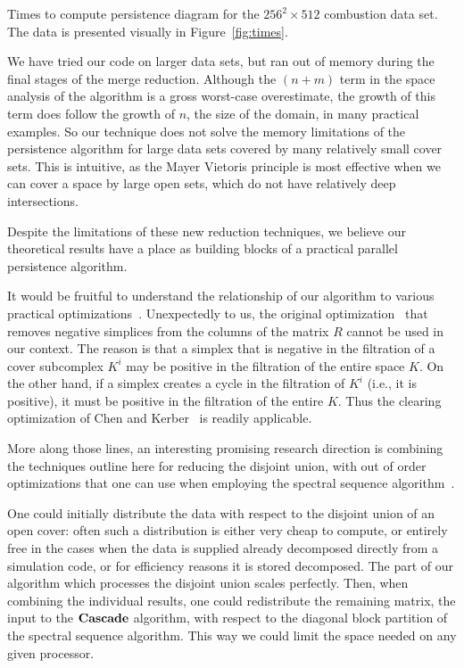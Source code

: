 \begin{table}
    \centering
    \pgfplotstabletypeset
    [
        every head row/.style={
            before row={
                \toprule
            },
            after row=\midrule,
        },
        columns={proc, time},
        columns/proc/.style         ={column name=processors, int detect, column type={r}},
        columns/time/.style         ={column name=seconds, fixed, column type={|r}},
    ]
    {\pltCombustionMed}
    \caption{Times to compute persistence diagram for the $256^2 \times 512$
             combustion data set. The data is presented visually in
             Figure~\ref{fig:times}.}
    \label{tbl:times}
\end{table}

We have tried our code on larger data sets, but ran out of memory during the
final stages of the merge reduction. Although the $(n+m)$ term in the space analysis of the
 algorithm is a gross worst-case overestimate, the growth of this
term does follow the growth of $n$, the size of the domain, in many practical
examples. So our technique does not solve the memory limitations of the
persistence algorithm for large data sets covered by many relatively small cover sets. This is
intuitive, as the Mayer Vietoris principle is most effective when we can cover a space by large open sets, which do not
have relatively deep intersections. 

Despite the limitations of these new reduction techniques, we believe our theoretical
results have a place as building blocks of a practical parallel persistence algorithm.

It would be fruitful to understand the relationship of our algorithm
to various practical optimizations~\cite{bkr-cccph-13}. 
Unexpectedly to us, the original optimization~\cite{elz-tps-02} that removes negative
simplices from the columns of the matrix $R$ cannot be used in our context.
The reason is that a simplex that is
negative in the filtration of a cover subcomplex $K^i$ may be positive in the
filtration of the entire space $K$.
On the other hand, if a simplex creates a cycle in the filtration of $K^i$
(i.e., it is positive), it must be positive in the filtration of the entire $K$.
Thus the clearing optimization of Chen and Kerber~\cite{bkr-cccph-13}
is readily applicable.

More along those lines, an interesting promising research direction is
combining the techniques outline here for reducing the disjoint union, with out of order optimizations that one can use when
employing the spectral sequence algorithm~\cite{bkr-cccph-13}.

One could initially distribute the data with respect to the disjoint union of an open cover:
often such a distribution is either very cheap to compute, or entirely
free in the cases when the data is supplied already decomposed directly from a simulation code,
or for efficiency reasons it is stored decomposed. The part of our algorithm which processes
the disjoint union scales perfectly. Then, when combining the individual results, one
could redistribute the remaining matrix, the input to the ${\bf Cascade}$
algorithm, with respect to the diagonal block partition of the spectral sequence
algorithm. This way we could limit the space needed on any given processor.
